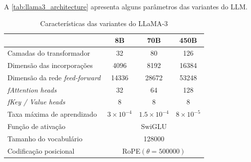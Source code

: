 A \autoref{tab:llama3_architecture} apresenta alguns parâmetros das variantes do \ac{LLM}.

\begin{table}[ht]
    \caption{\small Características das variantes do \ac{LLaMA}-3}
    \centering
    \begin{tabular}{l|ccc}
        \hline
                                               & 8B
                                               & 70B                                               & 450B
        \\ \hline
        Camadas do transformador               & 32
                                               & 80                                                & 126
        \\
        Dimensão das incorporações             & 4096
                                               & 8192                                              & 16384
        \\
        Dimensão da rede \textit{feed-forward} & 14336
                                               & 28672                                             & 53248
        \\
        \textit{fAttention heads}              & 32
                                               & 64                                                & 128
        \\
        \textit{fKey / Value heads}            & 8
                                               & 8                                                 & 8
        \\
        Taxa máxima de aprendizado             & \begin{math}3 \times 10^{-4}\end{math}
                                               & \begin{math}1.5 \times 10^{-4}\end{math}          & \begin{math}8
                                                                                                         \times

                                                                                                         10^{-5}\end{math} \\
        Função de ativação                     & \multicolumn{3}{c}{\ac{SwiGLU}}
        \\
        Tamanho do vocabulário                 & \multicolumn{3}{c}{128000}
        \\
        Codificação posicional                 & \multicolumn{3}{c}{\ac{RoPE}\begin{math}(\theta =
                                                                                 500000)\end{math}}
        \\ \hline
    \end{tabular}
    \label{tab:llama3_architecture}
\end{table}


